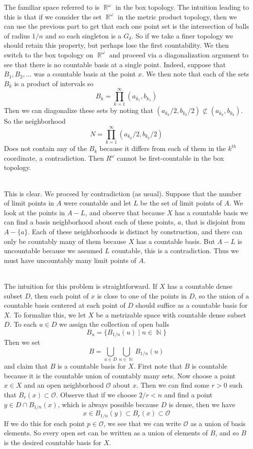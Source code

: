 \documentclass{article}
\DeclareMathOperator{\N}{\mathbb{N}}
\DeclareMathOperator{\R}{\mathbb{R}}
\DeclareMathOperator{\suchthat}{\mathrel{|}}
\newcommand{\problem}[1]{\noindent{\textbf{Problem #1}}\\}
\newcommand{\problempart}[1]{\noindent{\textbf{(#1)}}}
\begin{document}
\problempart{b} The familiar space referred to is $\R^\omega$ in the box topology. The intuition leading to this is that if we consider the set $\R^\omega$ in the metric product topology, then we can use the previous part to get that each one point set is the intersection of balls of radius $1/n$ and so each singleton is a $G_\delta$. So if we take a finer topology we should retain this property, but perhaps lose the first countability. We then switch to the box topology on $\R^\omega$ and proceed via a diagonalization argument to see that there is no countable basis at a single point. Indeed, suppose that $B_1, B_2, \ldots$ was a countable basis at the point $x$. We then note that each of the sets $B_k$ is a product of intervals so
\[
B_k = \prod_{k=1}^{\infty} (a_{k_1}, b_{k_1})
\]
Then we can diagonalize these sets by noting that $(a_{k_k}/2, b_{k_k}/2) \not\subset (a_{k_k}, b_{k_k})$. So the neighborhood
\[
N = \prod_{k=1}^\infty (a_{k_k}/2, b_{k_k}/2)
\]
Does not contain any of the $B_k$ because it differs from each of them in the $k^{th}$ coordinate, a contradiction. Then $R^\omega$ cannot be first-countable in the box topology. 

\problem{4.30.3} This is clear. We proceed by contradiction (as usual). Suppose that the number of limit points in $A$ were countable and let $L$ be the set of limit points of $A$. We look at the points in $A - L$, and observe that because $X$ has a countable basis we can find a basis neighborhood about each of these points, $a$, that is disjoint from $A - \{a\}$. Each of these neighborhoods is distinct by construction, and there can only be countably many of them because $X$ has a countable basis. But $A - L$ is uncountable because we assumed $L$ countable, this is a contradiction. Thus we must have uncountably many limit points of $A$. 

\problem{4.30.5}
\problempart{a} The intuition for this problem is straightforward. If $X$ has a countable dense subset $D$, then each point of $x$ is close to one of the points in $D$, so the union of a countable basis centered at each point of $D$ should suffice as a countable basis for $X$. To formalize this, we let $X$ be a metrizable space with countable dense subset $D$. To each $u \in D$ we assign the collection of open balls
\[
B_{u} = \{B_{1/n}(u) \suchthat n \in \N\}  
\]
Then we set 
\[
B = \bigcup_{u\in D}\bigcup_{n \in \N} B_{1/n}(u)
\]
and claim that $B$ is a countable basis for $X$. First note that $B$ is countable because it is the countable union of countably many sets. Now choose a point $x \in X$ and an open neighborhood $\mathcal{O}$ about $x$. Then we can find some $r > 0$ such that $B_r(x) \subset \mathcal{O}$. Observe that if we choose $2/r < n$ and find a point $y \in D \cap B_{1/n}(x)$, which is always possible because $D$ is dense, then we have
\[
x \in B_{1/n}(y) \subset B_{r}(x) \subset \mathcal{O}
\]
If we do this for each point $p \in \mathcal{O}$, we see that we can write $\mathcal{O}$ as a union of basis elements. So every open set can be written as a union of elements of $B$, and so $B$ is the desired countable basis for $X$.
 
\end{document}
